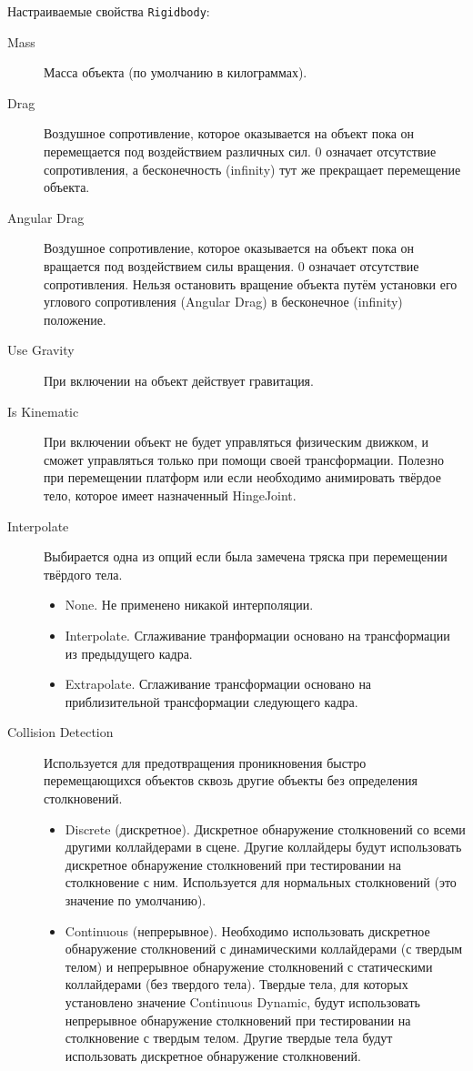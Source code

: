 Настраиваемые свойства \lstinline|Rigidbody|:
\begin{description}
	\item[Mass]	Масса объекта (по умолчанию в килограммах).
	\item[Drag]	Воздушное сопротивление, которое оказывается на объект пока он перемещается под воздействием различных сил. 0 означает отсутствие сопротивления, а бесконечность (infinity) тут же прекращает перемещение объекта.
	\item[Angular Drag]	Воздушное сопротивление, которое оказывается на объект пока он вращается под воздействием силы вращения. 0 означает отсутствие сопротивления. Нельзя остановить вращение объекта путём установки его углового сопротивления (Angular Drag) в бесконечное (infinity) положение.
	\item[Use Gravity]	При включении на объект действует гравитация.
	\item[Is Kinematic]	При включении объект не будет управляться физическим движком, и сможет управляться только при помощи своей трансформации. Полезно при перемещении платформ или если  необходимо анимировать твёрдое тело, которое имеет назначенный HingeJoint.
	\item[Interpolate]	Выбирается одна из опций если была замечена тряска при перемещении твёрдого тела.
	\begin{itemize}
		\item None.	Не применено никакой интерполяции.
		\item Interpolate. Сглаживание транформации основано на трансформации из предыдущего кадра.
		\item Extrapolate. Сглаживание трансформации основано на приблизительной трансформации следующего кадра.
	\end{itemize}
	\item[Collision Detection]	Используется для предотвращения проникновения быстро перемещающихся объектов сквозь другие объекты без определения столкновений.
	\begin{itemize}
		\item Discrete (дискретное). Дискретное обнаружение столкновений со всеми другими коллайдерами в сцене. Другие коллайдеры будут использовать дискретное обнаружение столкновений при тестировании на столкновение с ним. Используется для нормальных столкновений (это значение по умолчанию).
		\item Continuous (непрерывное). Необходимо использовать дискретное обнаружение столкновений с динамическими коллайдерами (с твердым телом) и непрерывное обнаружение столкновений с статическими коллайдерами (без твердого тела). Твердые тела, для которых установлено значение Continuous Dynamic, будут использовать непрерывное обнаружение столкновений при тестировании на столкновение с твердым телом. Другие твердые тела будут использовать дискретное обнаружение столкновений.

\end{itemize}
\end{description}
